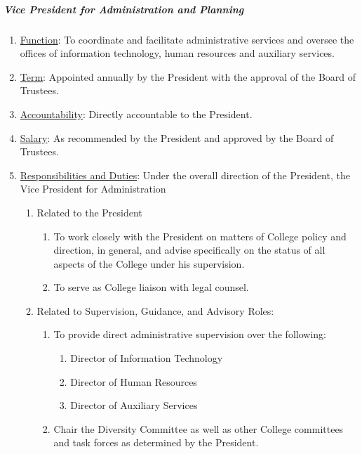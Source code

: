 \documentclass[letterpaper, 11pt]{article}
\begin{document}
				\subparagraph{Vice President for Administration and Planning}
					\begin{enumerate}[label=\alph*)]
						\item{\underline{Function}:  To coordinate and facilitate administrative services and oversee the offices of information technology, human resources and auxiliary services.}
						\item{\underline{Term}:  Appointed annually by the President with the approval of the Board of Trustees.}
						\item{\underline{Accountability}:  Directly accountable to the President.}
						\item{\underline{Salary}:  As recommended by the President and approved by the Board of Trustees.}
						\item{\underline{Responsibilities and Duties}:  Under the overall direction of the President, the Vice President for Administration
							\begin{enumerate}[label=\arabic*)]
								\item{Related to the President
									\begin{enumerate}[label=(\alph*)]
										\item{To work closely with the President on matters of College policy and direction, in general, and advise specifically on the status of all aspects of the College under his supervision.}
										\item{To serve as College liaison with legal counsel.}
									\end{enumerate}
								}
								\item{Related to Supervision, Guidance, and Advisory Roles:
									\begin{enumerate}[label=(\alph*)]
										\item{To provide direct administrative supervision over the following:
											\begin{enumerate}[label=()\arabic*)]
												\item{Director of Information Technology}
												\item{Director of Human Resources}
												\item{Director of Auxiliary Services}
											\end{enumerate}
										}
										\item{Chair the Diversity Committee as well as other College committees and task forces as determined by the President.}
									\end{enumerate}
								}
							\end{enumerate}
						}
					\end{enumerate}
\end{document}
